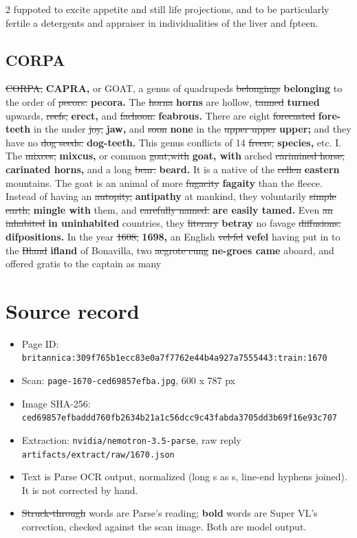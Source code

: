 \documentclass[10pt]{article}
\begin{document}
\begin{multicols}{2}
fuppoted to excite appetite and still life projections, and to be particularly fertile a detergents and appraiser in individualities of the liver and fpteen.

\subsection*{CORPA}
\sout{CORPA,} \textbf{CAPRA,} or GOAT, a genus of quadrupeds \sout{belongings} \textbf{belonging} to the order of \sout{pecors.} \textbf{pecora.} The \sout{horna} \textbf{horns} are hollow, \sout{tanned} \textbf{turned} upwards, \sout{reefs,} \textbf{erect,} and \sout{fachoon.} \textbf{feabrous.} There are eight \sout{forecasted} \textbf{fore-teeth} in the under \sout{joy,} \textbf{jaw,} and \sout{soon} \textbf{none} in the \sout{upper upper} \textbf{upper;} and they have no \sout{dog seeds.} \textbf{dog-teeth.} This genus conflicts of 14 \sout{freers,} \textbf{species,} etc. I. The \sout{mixces,} \textbf{mixcus,} or common \sout{goat,with} \textbf{goat, with} arched \sout{carimined horse,} \textbf{carinated horns,} and a long \sout{bear.} \textbf{beard.} It is a native of the \sout{cellen} \textbf{eastern} mountains. The goat is an animal of more \sout{fugacity} \textbf{fagaity} than the fleece. Instead of having an \sout{autopity,} \textbf{antipathy} at mankind, they voluntarily \sout{simple earth,} \textbf{mingle with} them, and \sout{carefully named.} \textbf{are easily tamed.} Even \sout{an inhabited} \textbf{in uninhabited} countries, they \sout{literary} \textbf{betray} no favage \sout{diffusions.} \textbf{difpositions.} In the year \sout{1608,} \textbf{1698,} an English \sout{vel-fel} \textbf{vefel} having put in to the \sout{Bland} \textbf{ifland} of Bonavilla, two \sout{acgrote cung} \textbf{ne-groes came} aboard, and offered gratis to the captain as many
\end{multicols}
\section*{Source record}
\begin{itemize}
\item Page ID: \texttt{britannica:309f765b1ecc83e0a7f7762e44b4a927a7555443:train:1670}
\item Scan: \texttt{page-1670-ced69857efba.jpg}, 600 x 787 px
\item Image SHA-256: \texttt{\small ced69857efbaddd760fb2634b21a1c56dcc9c43fabda3705dd3b69f16e93c707}
\item Extraction: \texttt{nvidia/nemotron-3.5-parse}, raw reply \texttt{artifacts/extract/raw/1670.json}
\item Text is Parse OCR output, normalized (long s as s, line-end hyphens joined). It is not corrected by hand.
\item \sout{Struck-through} words are Parse's reading; \textbf{bold} words are Super VL's correction, checked against the scan image. Both are model output.
\end{itemize}
\end{document}
